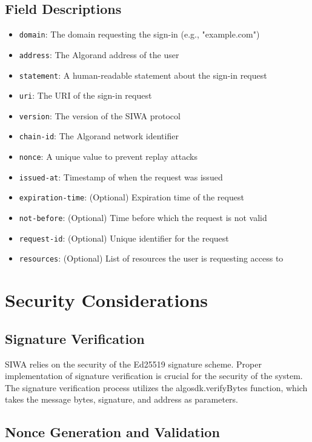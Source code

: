 \documentclass[12pt, a4paper, twocolumn]{article}
\begin{document}
\subsection{Field Descriptions}

\begin{itemize}[label=\textendash, itemsep=-0.5em]
  \item \verb=domain=: The domain requesting the sign-in (e.g., "example.com")
  \item \verb=address=: The Algorand address of the user
  \item \verb=statement=: A human-readable statement about the sign-in request
  \item \verb=uri=: The URI of the sign-in request
  \item \verb=version=: The version of the SIWA protocol
  \item \verb=chain-id=: The Algorand network identifier
  \item \verb=nonce=: A unique value to prevent replay attacks
  \item \verb=issued-at=: Timestamp of when the request was issued
  \item \verb=expiration-time=: (Optional) Expiration time of the request
  \item \verb=not-before=: (Optional) Time before which the request is not valid
  \item \verb=request-id=: (Optional) Unique identifier for the request
  \item \verb=resources=: (Optional) List of resources the user is requesting access to
\end{itemize}

\section{Security Considerations}

\subsection{Signature Verification}

SIWA relies on the security of the Ed25519 signature scheme. Proper implementation of signature verification is crucial for the security of the system. The signature verification process utilizes the algosdk.verifyBytes function, which takes the message bytes, signature, and address as parameters.

\subsection{Nonce Generation and Validation}
\end{document}
